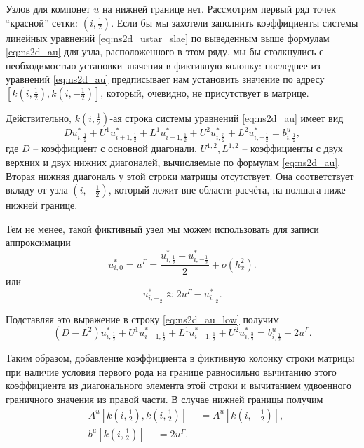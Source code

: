 Узлов для компонет $u$ на нижней границе нет.
Рассмотрим первый ряд точек ``красной'' сетки: $(i, \tfrac12)$.
Если бы мы захотели заполнить коэффициенты системы
линейных уравнений \eqref{eq:ns2d_ustar_slae}
по выведенным выше формулам \eqref{eq:ns2d_au}
для узла, расположенного в этом ряду, мы бы столкнулись
с необходимостью установки значения в фиктивную колонку:
последнее из уравнений \eqref{eq:ns2d_au}
предписывает нам установить значение по адресу
$[k(i, \tfrac12), k(i, -\tfrac12)]$, который, очевидно, не присутствует в матрице.

Действительно, $k(i,\tfrac12)$-ая строка системы уравнений \eqref{eq:ns2d_au}
имеет вид
\begin{equation}
    \label{eq:ns2d_au_low}
      D    u^*_{i, \tfrac12}
    + U^1  u^*_{i+1, \tfrac12}
    + L^1  u^*_{i-1, \tfrac12}
    + U^2 u^*_{i, \tfrac32}
    + L^2 u^*_{i, -\tfrac12} 
    = b^u_{i, \tfrac12},
\end{equation}
где $D$ -- коэффициент с основной диагонали, $U^{1,2}, L^{1,2}$ -- 
коэффициенты с двух верхних и двух нижних диагоналей, вычисляемые по формулам \eqref{eq:ns2d_au}.
Вторая нижняя диагональ у этой строки матрицы отсутствует.
Она соответствует вкладу от узла $(i, -\tfrac12)$, который лежит вне области расчёта, на полшага ниже
нижней границе.

Тем не менее, такой фиктивный узел мы можем 
использовать для записи аппроксимации
\begin{equation*}
    u^*_{i,0} = u^\Gamma = \frac{u^*_{i,\tfrac12} + u^*_{i, -\tfrac12}}{2} + o(h_x^2).
\end{equation*}
или
\begin{equation*}
    u^*_{i, -\tfrac12} \approx 2u^\Gamma - u^*_{i,\tfrac12}.
\end{equation*}

Подставляя это выражение в строку \eqref{eq:ns2d_au_low} получим
\begin{equation*}
      (D - L^2) u^*_{i, \tfrac12}
    + U^1       u^*_{i+1, \tfrac12}
    + L^1       u^*_{i-1, \tfrac12}
    + U^2       u^*_{i, \tfrac32}
    = b^u_{i, \tfrac12} + 2 u^\Gamma.
\end{equation*}

Таким образом, добавление коэффициента в фиктивную колонку строки матрицы при
наличие условия первого рода на границе равносильно
вычитанию этого коэффициента из диагонального элемента этой строки
и вычитанием удвоенного граничного значения из правой части.
В случае нижней границы получим
\begin{align}
    \label{eq:ns2d_bc2}
    &A^u[k(i, \tfrac12), k(i, \tfrac12)] \mathrel{-}= A^u[k(i, -\tfrac12)], \\[10pt]
    \nonumber
    &b^u[k(i, \tfrac12)] \mathrel{-}= 2 u^\Gamma.
\end{align}

